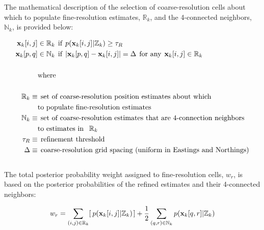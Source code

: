 The mathematical description of the selection of coarse-resolution cells about which to populate fine-resolution estimates, $\mathbb{R}_k$, and the 4-connected neighbors, $\mathbb{N}_k$, is provided below:

\begin{align}
\begin{split}
\mathbf{x}_k[i,j] &\in \mathbb{R}_k \hspace{1ex} \text{if} \hspace{1ex} p(\mathbf{x}_k[i,j] | \mathbb{Z}_k) \geq \tau_{R} \\
\mathbf{x}_k[p,q] &\in \mathbb{N}_k \hspace{1ex} \text{if} \hspace{1ex} | \mathbf{x}_k[p,q] - \mathbf{x}_k[i,j] | = \Delta \hspace{1ex} \text{for any} \hspace{1ex} \mathbf{x}_k[i,j] \in \mathbb{R}_k \\ \\
&\text{where} \\ \\
\mathbb{R}_k \equiv &\hspace{1ex}\text{set of coarse-resolution position estimates about which} \\
& \text{to populate fine-resolution estimates} \\
\mathbb{N}_k \equiv &\hspace{1ex}\text{set of coarse-resolution estimates that are 4-connection neighbors} \\ 
&\text{to estimates in } \hspace{1ex} \mathbb{R}_k \\
\tau_R \equiv &\hspace{1ex}\text{refinement threshold} \\
\Delta \equiv &\hspace{1ex}\text{coarse-resolution grid spacing (uniform in Eastings and Northings)} \\
\end{split}
\label{eq:Sets}
\end{align}
\\

The total posterior probability weight assigned to fine-resolution cells, $w_r$, is based on the posterior probabilities of the refined estimates and their 4-connected neighbors:

\begin{align}
\begin{split}
w_r &= \sum_{(i,j) \in \mathbb{R}_k} [\hspace{0.5ex} p(\mathbf{x}_k[i,j] | \mathbb{Z}_k) \hspace{0.3ex}] + \frac{1}{2} \sum_{(q,r) \in \mathbb{N}_k}  p(\mathbf{x}_k[q,r] | \mathbb{Z}_k) \\
\end{split}
\label{eq:refineWeights}
\end{align}

